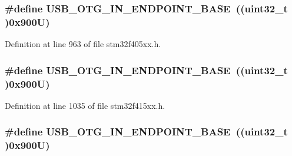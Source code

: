 \subsubsection[{\texorpdfstring{U\+S\+B\+\_\+\+O\+T\+G\+\_\+\+I\+N\+\_\+\+E\+N\+D\+P\+O\+I\+N\+T\+\_\+\+B\+A\+SE}{USB_OTG_IN_ENDPOINT_BASE}}]{\setlength{\rightskip}{0pt plus 5cm}\#define U\+S\+B\+\_\+\+O\+T\+G\+\_\+\+I\+N\+\_\+\+E\+N\+D\+P\+O\+I\+N\+T\+\_\+\+B\+A\+SE~((uint32\+\_\+t )0x900\+U)}\hypertarget{group___peripheral__registers__structures_gad8f69041452615aeb3948600e3882246}{}\label{group___peripheral__registers__structures_gad8f69041452615aeb3948600e3882246}


Definition at line 963 of file stm32f405xx.\+h.

\subsubsection[{\texorpdfstring{U\+S\+B\+\_\+\+O\+T\+G\+\_\+\+I\+N\+\_\+\+E\+N\+D\+P\+O\+I\+N\+T\+\_\+\+B\+A\+SE}{USB_OTG_IN_ENDPOINT_BASE}}]{\setlength{\rightskip}{0pt plus 5cm}\#define U\+S\+B\+\_\+\+O\+T\+G\+\_\+\+I\+N\+\_\+\+E\+N\+D\+P\+O\+I\+N\+T\+\_\+\+B\+A\+SE~((uint32\+\_\+t )0x900\+U)}\hypertarget{group___peripheral__registers__structures_gad8f69041452615aeb3948600e3882246}{}\label{group___peripheral__registers__structures_gad8f69041452615aeb3948600e3882246}


Definition at line 1035 of file stm32f415xx.\+h.

\subsubsection[{\texorpdfstring{U\+S\+B\+\_\+\+O\+T\+G\+\_\+\+I\+N\+\_\+\+E\+N\+D\+P\+O\+I\+N\+T\+\_\+\+B\+A\+SE}{USB_OTG_IN_ENDPOINT_BASE}}]{\setlength{\rightskip}{0pt plus 5cm}\#define U\+S\+B\+\_\+\+O\+T\+G\+\_\+\+I\+N\+\_\+\+E\+N\+D\+P\+O\+I\+N\+T\+\_\+\+B\+A\+SE~((uint32\+\_\+t )0x900\+U)}\hypertarget{group___peripheral__registers__structures_gad8f69041452615aeb3948600e3882246}{}\label{group___peripheral__registers__structures_gad8f69041452615aeb3948600e3882246}


